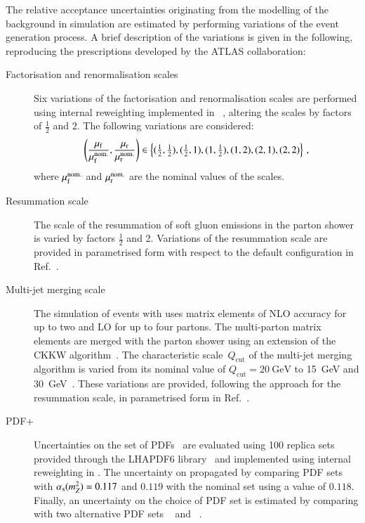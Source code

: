 The relative acceptance uncertainties originating from the modelling
of the \ZHF background in simulation are estimated by performing
variations of the event generation process. A brief description of the
variations is given in the following, reproducing the prescriptions
developed by the ATLAS collaboration:
\begin{description}

\item[Factorisation and renormalisation scales] Six variations of the
  factorisation and renormalisation scales are performed using
  internal reweighting implemented in
  \SHERPA[2.2.1]~\cite{Bothmann:2019yzt}, altering the scales by
  factors of $\frac{1}{2}$ and $2$. The following variations are
  considered:
  \begin{align*}
    \left( \frac{\mu_\mathrm{f}}{\mu_\mathrm{f}^{\text{nom.}}}, \frac{\mu_\mathrm{r}}{\mu_\mathrm{r}^{\text{nom.}}} \right) \in
    \left\{ (\tfrac{1}{2}, \tfrac{1}{2}), (\tfrac{1}{2}, 1), (1, \tfrac{1}{2}), (1, 2), (2, 1), (2, 2) \right\} \,\text{,}
  \end{align*}
  where $\mu_\mathrm{f}^{\text{nom.}}$ and $\mu_\mathrm{r}^{\text{nom.}}$ are the nominal
  values of the scales.

\item[Resummation scale] The scale of the resummation of soft gluon
  emissions in the \SHERPA parton shower is varied by factors
  $\frac{1}{2}$ and 2. Variations of the resummation scale are
  provided in parametrised form with respect to the default \SHERPA
  configuration in Ref.~\cite{anders:2017}.

\item[Multi-jet merging scale] The simulation of \Zjets events with
  \SHERPA[2.2.1] uses matrix elements of NLO accuracy for up to two
  and LO for up to four partons. The multi-parton matrix elements are
  merged with the parton shower using an extension of the CKKW
  algorithm~\cite{Catani:2001cc,Hoeche:2009rj,Hoeche:2012yf}. The
  characteristic scale~$Q_{\text{cut}}$ of the multi-jet merging
  algorithm is varied from its nominal value of
  $Q_{\text{cut}} = \SI{20}{\GeV}$ to \SI{15}{\GeV} and
  \SI{30}{\GeV}~\cite{anders:2017}. These variations are provided,
  following the approach for the resummation scale, in parametrised
  form in Ref.~\cite{anders:2017}.

\item[PDF+\alphas] Uncertainties on the \NNPDF[3.0nnlo] set of
  PDFs~\cite{Ball:2014uwa} are evaluated using 100 replica sets
  provided through the \textsc{LHAPDF6} library~\cite{Buckley:2014ana}
  and implemented using internal reweighting in \SHERPA. The
  uncertainty on \alphas propagated by comparing \NNPDF[3.0nnlo] PDF
  sets with $\alpha_{\text{s}}(m_{Z}^2) = 0.117$ and $0.119$ with the nominal set
  using a value of $0.118$. Finally, an uncertainty on the choice of
  PDF set is estimated by comparing with two alternative PDF sets
  \MMHT[nnlo68cl]~\cite{Harland-Lang:2014zoa} and
  \CT[14nnlo]~\cite{Dulat:2015mca}.


\end{description}
